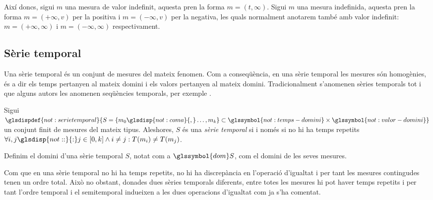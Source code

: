 Així doncs, sigui $m$ una mesura de valor indefinit, aquesta pren la
forma $m=(t,\infty)$. Sigui $m$ una mesura indefinida, aquesta pren la
forma $m=(+\infty,v)$ per la positiva i $m=(-\infty,v)$ per la
negativa, les quals normalment anotarem també amb valor indefinit:
$m=(+\infty,\infty)$ i $m=(-\infty,\infty)$ respectivament.








\subsection{Sèrie temporal}
\label{sec:model:serietemporal}

Una sèrie temporal és un conjunt de mesures del mateix fenomen.  Com a
conseqüència, en una sèrie temporal les mesures són homogènies, és a
dir els temps pertanyen al mateix domini i els valors pertanyen al
mateix domini.  Tradicionalment s'anomenen sèries temporals tot i que
alguns autors les anomenen seqüències temporals, per exemple
\textcite{last:hetland}.

\begin{definition}
  \label{def:serie_temporal}
  Sigui
  $\glsdispdef{not:serietemporal}{S=\{m_0\glsdisp{not:coma}{,}\ldots,m_k\}
    \subset \glssymbol{not:temps-domini} \times
    \glssymbol{not:valor-domini}}$ un conjunt finit de mesures del
  mateix tipus.  Aleshores, $S$ és una \emph{sèrie temporal} si i
  només si no hi ha temps repetits $\forall i,j\glsdisp{not::}{:}
  j\in[0,k] \wedge i \neq j : T(m_i)\neq T(m_j)$.

  Definim el domini d'una sèrie temporal $S$, notat com a
  $\glssymbol{dom}S$, com el domini de les seves mesures.
\end{definition}


Com que en una sèrie temporal no hi ha temps repetits, no hi ha
discrepància en l'operació d'igualtat i per tant les mesures
contingudes tenen un ordre total. Això no obstant, donades dues sèries
temporals diferents, entre totes les mesures hi pot haver temps
repetits i per tant l'ordre temporal i el semitemporal indueixen a les
dues operacions d'igualtat com ja s'ha comentat.



